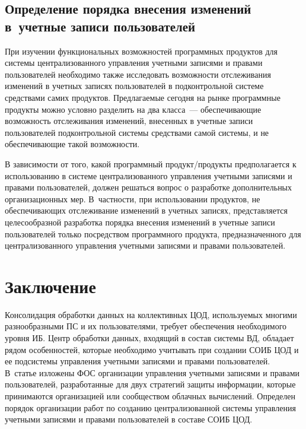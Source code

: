 \begin{multicols}{2}
\subsection{Определение порядка внесения изменений в~учетные записи 
пользователей}
       
       При изучении функциональных возможностей программных продуктов для 
сис\-те\-мы централизованного управления учетными записями и правами пользователей 
необходимо также исследовать возможности отслеживания изменений в учетных записях 
пользователей в подконтрольной сис\-те\-ме средствами самих продуктов. Предлагаемые 
сегодня на рынке программные продукты можно условно разделить на два класса~--- 
обеспечивающие возможность отслеживания изменений, внесенных в учетные записи 
пользователей подконтрольной сис\-те\-мы средствами самой сис\-те\-мы, и не обеспечивающие 
такой возможности.
       
       В зависимости от того, какой программный продукт/продукты предполагается к 
использованию в сис\-те\-ме централизованного управления учетными записями и правами 
пользователей, должен решаться вопрос о разработке дополнительных организационных 
мер. В~частности, при использовании продуктов, не обеспечивающих отслеживание\linebreak 
изменений в учетных записях, представляется целесообразной разработка порядка 
внесения из\-менений в учетные записи пользователей только\linebreak
посредством программного 
продукта, предназначенного для централизованного управления учетными записями и 
правами пользователей.

\section{Заключение}
       
       Консолидация обработки данных на коллективных ЦОД, 
используемых многими разнообразными ПС и их пользователями, требует обеспечения 
необходимого уровня ИБ. Центр обработки данных, входящий в со\-став сис\-те\-мы 
ВД, обладает рядом особенностей, которые необходимо учитывать при 
создании СОИБ ЦОД и ее под\-сис\-те\-мы 
управления учетными записями и правами пользователей. В~статье изложены
ФОС организации  управ\-ле\-ния\linebreak
 учетными записями и правами пользователей, разработанные для 
двух стратегий защиты информации, которые принимаются организацией или 
сообщест\-вом облачных вычислений. Определен порядок организации работ по созданию 
централизованной сис\-те\-мы управ\-ле\-ния учетными записями и правами 
пользователей в составе СОИБ ЦОД.


\end{multicols}
